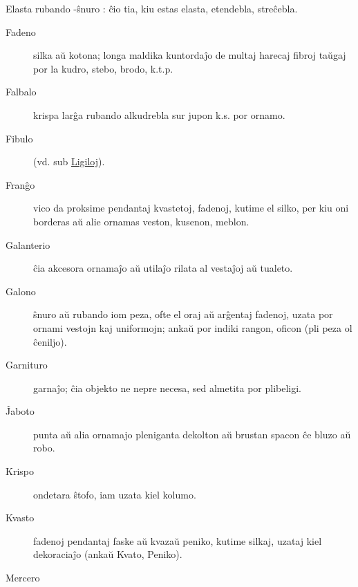 Elasta rubando -ŝnuro : ĉio tia, kiu estas elasta, etendebla, streĉebla.

\begin{description}
\item[Fadeno]

 silka aŭ kotona; longa maldika kuntordaĵo de multaj harecaj fibroj taŭgaj por la kudro, stebo, brodo, k.t.p.

\item[Falbalo]

 krispa larĝa rubando alkudrebla sur jupon k.s. por ornamo.

\item[Fibulo]

 (vd. sub \hyperlink{Ligoj}{Ligiloj}).

\item[Franĝo]

 vico da proksime pendantaj kvastetoj, fadenoj, kutime el silko, per kiu oni borderas aŭ alie ornamas veston, kusenon, meblon.

\item[Galanterio]

 ĉia akcesora ornamaĵo aŭ utilaĵo rilata al vestaĵoj aŭ tualeto.

\item[Galono]

 ŝnuro aŭ rubando iom peza, ofte el oraj aŭ arĝentaj fadenoj, uzata por ornami vestojn kaj uniformojn; ankaŭ por indiki rangon, oficon (pli peza ol ĉeniljo).

\item[Garnituro]

 garnaĵo; ĉia objekto ne nepre necesa, sed almetita por plibeligi.

\item[Ĵaboto]

 punta aŭ alia ornamajo pleniganta dekolton aŭ brustan spacon ĉe bluzo aŭ robo.

\item[Krispo]

 ondetara ŝtofo, iam uzata kiel kolumo.

\item[Kvasto]

 fadenoj pendantaj faske aŭ kvazaŭ peniko, kutime silkaj, uzataj kiel dekoraciaĵo (ankaŭ Kvato, Peniko).

\item[Mercero]


\end{description}
